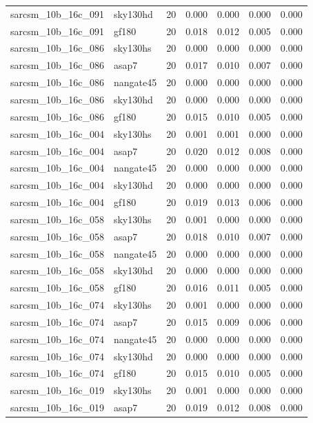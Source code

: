 \begin{tabular}{llrrrrr}
sarcsm\_10b\_16c\_091 & sky130hd & 20 & 0.000 & 0.000 & 0.000 & 0.000 \\
sarcsm\_10b\_16c\_091 & gf180 & 20 & 0.018 & 0.012 & 0.005 & 0.000 \\
sarcsm\_10b\_16c\_086 & sky130hs & 20 & 0.000 & 0.000 & 0.000 & 0.000 \\
sarcsm\_10b\_16c\_086 & asap7 & 20 & 0.017 & 0.010 & 0.007 & 0.000 \\
sarcsm\_10b\_16c\_086 & nangate45 & 20 & 0.000 & 0.000 & 0.000 & 0.000 \\
sarcsm\_10b\_16c\_086 & sky130hd & 20 & 0.000 & 0.000 & 0.000 & 0.000 \\
sarcsm\_10b\_16c\_086 & gf180 & 20 & 0.015 & 0.010 & 0.005 & 0.000 \\
sarcsm\_10b\_16c\_004 & sky130hs & 20 & 0.001 & 0.001 & 0.000 & 0.000 \\
sarcsm\_10b\_16c\_004 & asap7 & 20 & 0.020 & 0.012 & 0.008 & 0.000 \\
sarcsm\_10b\_16c\_004 & nangate45 & 20 & 0.000 & 0.000 & 0.000 & 0.000 \\
sarcsm\_10b\_16c\_004 & sky130hd & 20 & 0.000 & 0.000 & 0.000 & 0.000 \\
sarcsm\_10b\_16c\_004 & gf180 & 20 & 0.019 & 0.013 & 0.006 & 0.000 \\
sarcsm\_10b\_16c\_058 & sky130hs & 20 & 0.001 & 0.000 & 0.000 & 0.000 \\
sarcsm\_10b\_16c\_058 & asap7 & 20 & 0.018 & 0.010 & 0.007 & 0.000 \\
sarcsm\_10b\_16c\_058 & nangate45 & 20 & 0.000 & 0.000 & 0.000 & 0.000 \\
sarcsm\_10b\_16c\_058 & sky130hd & 20 & 0.000 & 0.000 & 0.000 & 0.000 \\
sarcsm\_10b\_16c\_058 & gf180 & 20 & 0.016 & 0.011 & 0.005 & 0.000 \\
sarcsm\_10b\_16c\_074 & sky130hs & 20 & 0.001 & 0.000 & 0.000 & 0.000 \\
sarcsm\_10b\_16c\_074 & asap7 & 20 & 0.015 & 0.009 & 0.006 & 0.000 \\
sarcsm\_10b\_16c\_074 & nangate45 & 20 & 0.000 & 0.000 & 0.000 & 0.000 \\
sarcsm\_10b\_16c\_074 & sky130hd & 20 & 0.000 & 0.000 & 0.000 & 0.000 \\
sarcsm\_10b\_16c\_074 & gf180 & 20 & 0.015 & 0.010 & 0.005 & 0.000 \\
sarcsm\_10b\_16c\_019 & sky130hs & 20 & 0.001 & 0.000 & 0.000 & 0.000 \\
sarcsm\_10b\_16c\_019 & asap7 & 20 & 0.019 & 0.012 & 0.008 & 0.000 \\

\end{tabular}

